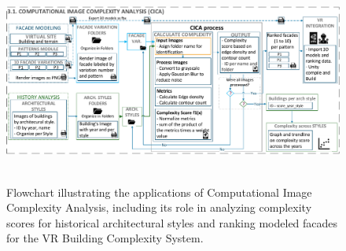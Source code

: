 \documentclass[final,5p,times]{elsarticle}
\begin{document}
            \begin{figure}[!htb]
                \centering
                \includegraphics[width= \linewidth]{Images/ImageComplexityAnalysisFlowchart}~\caption{Flowchart illustrating the applications of Computational Image Complexity Analysis, including its role in analyzing complexity scores for historical architectural styles and ranking modeled facades for the VR Building Complexity System.}
                  \label{fig:ImageComplexityAnalysisFlowchart}
            \end{figure}
\end{document}

